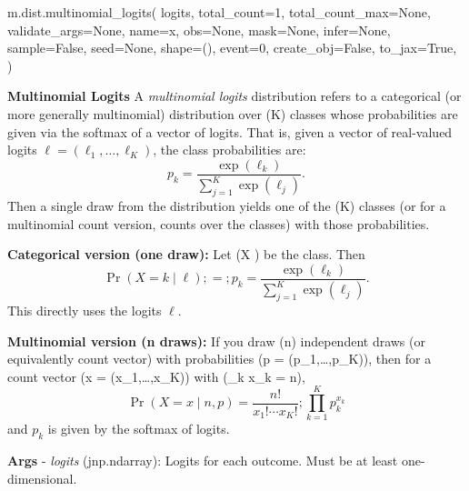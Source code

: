 \documentclass[
  letterpaper,
  DIV=11,
  numbers=noendperiod]{scrartcl}
\newenvironment{Shaded}{\begin{snugshade}}{\end{snugshade}}
\newcommand{\DecValTok}[1]{\textcolor[rgb]{0.68,0.00,0.00}{#1}}
\newcommand{\NormalTok}[1]{\textcolor[rgb]{0.00,0.23,0.31}{#1}}
\newcommand{\OperatorTok}[1]{\textcolor[rgb]{0.37,0.37,0.37}{#1}}
\newcommand{\StringTok}[1]{\textcolor[rgb]{0.13,0.47,0.30}{#1}}
\newcommand{\VariableTok}[1]{\textcolor[rgb]{0.07,0.07,0.07}{#1}}
\begin{document}
\begin{Shaded}
\begin{Highlighting}[]
\NormalTok{m.dist.multinomial\_logits(}
\NormalTok{    logits,}
\NormalTok{    total\_count}\OperatorTok{=}\DecValTok{1}\NormalTok{,}
\NormalTok{    total\_count\_max}\OperatorTok{=}\VariableTok{None}\NormalTok{,}
\NormalTok{    validate\_args}\OperatorTok{=}\VariableTok{None}\NormalTok{,}
\NormalTok{    name}\OperatorTok{=}\StringTok{\textquotesingle{}x\textquotesingle{}}\NormalTok{,}
\NormalTok{    obs}\OperatorTok{=}\VariableTok{None}\NormalTok{,}
\NormalTok{    mask}\OperatorTok{=}\VariableTok{None}\NormalTok{,}
\NormalTok{    infer}\OperatorTok{=}\VariableTok{None}\NormalTok{,}
\NormalTok{    sample}\OperatorTok{=}\VariableTok{False}\NormalTok{,}
\NormalTok{    seed}\OperatorTok{=}\VariableTok{None}\NormalTok{,}
\NormalTok{    shape}\OperatorTok{=}\NormalTok{(),}
\NormalTok{    event}\OperatorTok{=}\DecValTok{0}\NormalTok{,}
\NormalTok{    create\_obj}\OperatorTok{=}\VariableTok{False}\NormalTok{,}
\NormalTok{    to\_jax}\OperatorTok{=}\VariableTok{True}\NormalTok{,}
\NormalTok{)}
\end{Highlighting}
\end{Shaded}

\textbf{Multinomial Logits} A \emph{multinomial logits} distribution
refers to a categorical (or more generally multinomial) distribution
over (K) classes whose probabilities are given via the softmax of a
vector of logits. That is, given a vector of real-valued logits
\(\ell = (\ell_1, …, \ell_K)\), the class probabilities are: \[
  p_k = \frac{\exp(\ell_k)}{\sum_{j=1}^K \exp(\ell_j)}.
  \] Then a single draw from the distribution yields one of the (K)
classes (or for a multinomial count version, counts over the classes)
with those probabilities.

\textbf{Categorical version (one draw):} Let (X ) be
the class. Then \[
  \Pr(X=k \mid \ell) ;=; p_k = \frac{\exp(\ell_k)}{\sum_{j=1}^K \exp(\ell_j)}.
  \] This directly uses the logits \(\ell\).

\textbf{Multinomial version (n draws):} If you draw (n) independent
draws (or equivalently count vector) with probabilities (p =
(p\_1,\ldots,p\_K)), then for a count vector (x = (x\_1,\ldots,x\_K))
with (\sum\_k x\_k = n), \[
  \Pr(X = x \mid n, p) = \frac{n!}{x_1! \cdots x_K!} ; \prod_{k=1}^K p_k^{x_k}
  \] and \(p_k\) is given by the softmax of logits.

\textbf{Args} - \emph{logits} (jnp.ndarray): Logits for each outcome.
Must be at least one-dimensional.
\end{document}
